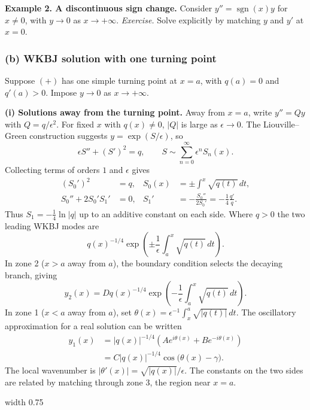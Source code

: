 \documentclass[11pt,a4paper]{article}
\begin{document}
\noindent\textbf{Example 2. A discontinuous sign change.}
Consider $y''=\operatorname{sgn}(x)y$ for $x\ne0$, with $y\to0$
as $x\to+\infty$. \emph{Exercise.} Solve explicitly by matching
$y$ and $y'$ at $x=0$.

\subsubsection*{(b) WKBJ solution with one turning point}

Suppose $(+)$ has one simple turning point
at $x=a$, with $q(a)=0$ and $q'(a)>0$. Impose $y\to0$ as
$x\to+\infty$.

\medskip
\noindent\textbf{(i) Solutions away from the turning point.}
Away from $x=a$, write $y''=Qy$ with $Q=q/\epsilon^2$. For fixed
$x$ with $q(x)\ne0$, $|Q|$ is large as $\epsilon\to0$. The
Liouville--Green construction suggests $y=\exp(S/\epsilon)$, so
\[
    \epsilon S''+(S')^2=q,\qquad
    S\sim\sum_{n=0}^{\infty}\epsilon^n S_n(x).
\]
Collecting terms of orders $1$ and $\epsilon$ gives
\begin{align*}
    (S_0')^2 &= q,
    & S_0(x) &= \pm\int^x\sqrt{q(t)}\,dt,\\
    S_0''+2S_0'S_1' &= 0,
    & S_1' &= -\frac{S_0''}{2S_0'}=-\frac14\frac{q'}{q}.
\end{align*}
Thus $S_1=-\tfrac14\ln|q|$ up to an additive constant on each
side. Where $q>0$ the two leading WKBJ modes are
\[
    q(x)^{-1/4}\exp\!\left(\pm\frac1\epsilon
                                      \int_a^x\sqrt{q(t)}\,dt\right).
\]
In zone 2 ($x>a$ away from $a$), the boundary condition selects
the decaying branch, giving
\[
    y_2(x)=Dq(x)^{-1/4}\exp\!\left(-\frac1\epsilon
                                      \int_a^x\sqrt{q(t)}\,dt\right).
\]
In zone 1 ($x<a$ away from $a$), set
$\theta(x)=\epsilon^{-1}\int_x^a\sqrt{|q(t)|}\,dt$. The oscillatory
approximation for a real solution can be written
\begin{align*}
    y_1(x)
    &= |q(x)|^{-1/4}\left(Ae^{i\theta(x)}+Be^{-i\theta(x)}\right)\\
    &= C|q(x)|^{-1/4}\cos\bigl(\theta(x)-\gamma\bigr).
\end{align*}
The local wavenumber is $|\theta'(x)|=\sqrt{|q(x)|}/\epsilon$.
The constants on the two sides are related by matching through
zone 3, the region near $x=a$.
\begin{center}
    \pdfximage width 0.75\linewidth {figures/asymptotic-lecture13/wkbj-zones.png}
    \leavevmode\pdfrefximage\pdflastximage
\end{center}
\end{document}
